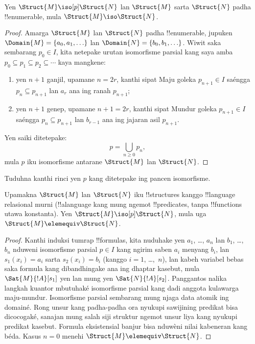 \documentclass[../../../include/open-logic-section]{subfiles}
\begin{document}
\begin{thm}
  Yen $\Struct{M} \iso[p] \Struct{N}$
  lan $\Struct{M}$ sarta
  $\Struct{N}$ padha !!{enumerable},
  mula $\Struct{M} \iso
  \Struct{N}$.
\end{thm}

\begin{proof}
  Amarga $\Struct{M}$ lan
  $\Struct{N}$ padha !!{enumerable},
  jupuken $\Domain{M} =
  \{a_0, a_1, \ldots \}$
  lan $\Domain{N} = \{b_0, b_1, \ldots \}$.
  Wiwit saka sembarang $p_0 \in I$,
  kita netepake urutan isomorfisme parsial
  kang saya amba $p_0 \subseteq p_1
  \subseteq p_2 \subseteq \cdots$
  kaya mangkene:
  \begin{enumerate}
  \item yen $n+1$ ganjil, upamane $n = 2r$,
    kanthi sipat Maju goleka
    $p_{n+1} \in I$ saéngga
    $p_n \subseteq p_{n+1}$
    lan $a_r$ ana ing ranah $p_{n+1}$;
  \item yen $n+1$ genep, upamane
    $n+1 =2r$, kanthi sipat Mundur
    goleka $p_{n+1} \in I$ saéngga
    $p_n \subseteq p_{n+1}$
    lan $b_{r-1}$ ana ing jajaran
    asil $p_{n+1}$.
  \end{enumerate}
Yen saiki ditetepake:
\[
p = \bigcup_{n\ge 0} p_n,
\]
mula $p$ iku isomorfisme
antarane $\Struct{M}$
lan $\Struct{N}$.
\end{proof}

\begin{prob}
  Tuduhna kanthi rinci yen $p$
  kang ditetepake ing
  pancen isomorfisme.
\end{prob}

\begin{thm}
  Upamakna $\Struct{M}$ lan
  $\Struct{N}$ iku !!{structure}s
  kanggo !!{language} relasional
  murni (!!a{language} kang mung
  ngemot !!{predicate}s,
  tanpa !!{function}s utawa konstanta).
  Yen $\Struct{M} \iso[p] \Struct{N}$,
  mula uga $\Struct{M} \elemequiv
  \Struct{N}$.
\end{thm}

\begin{proof}
  Kanthi induksi tumrap !!{formula}s,
  kita nuduhake yen $a_1$, \dots, $a_n$
  lan $b_1$, \dots, $b_n$
  nduweni isomorfisme parsial $p \in I$
  kang ngirim saben $a_i$ menyang $b_i$,
  lan $s_1(x_i) =a_i$ sarta
  $s_2(x_i) =b_i$ (kanggo $i =1$,
  \dots,~$n$), lan kabeh variabel bebas saka formula kang dibandhingake ana ing dhaptar kasebut, mula
  $\Sat{M}{!A}[s_1]$ yen lan
  mung yen $\Sat{N}{!A}[s_2]$.
  Panggantos nalika langkah kuantor mbutuhaké isomorfisme parsial kang dadi anggota kulawarga maju-mundur. Isomorfisme parsial sembarang mung njaga data atomik ing domainé. Rong unsur kang padha-padha ora nyukupi sawijining predikat bisa dicocogaké, sanajan mung salah siji struktur ngemot unsur liya kang nyukupi predikat kasebut. Formula eksistensial banjur bisa nduwèni nilai kabeneran kang béda.
  Kasus $n=0$ menehi
  $\Struct{M} \elemequiv \Struct{N}$.
\end{proof}
\end{document}
